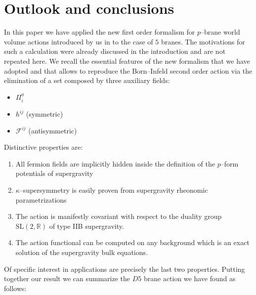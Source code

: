 \documentclass[a4paper,11pt]{article}
\begin{document}
\section{Outlook and conclusions}
\label{outlook}
In this paper we have applied the new first order formalism for
$p$--brane world volume actions introduced by us in \cite{noidued3} to the case of
$5$ branes. The motivations for such a calculation were already discussed in the introduction and
are not repeated here. We recall the essential features of the new formalism  that
we have adopted and that allows to reproduce the
Born--Infeld second order action via the elimination of a set composed by three auxiliary fields:
\begin{itemize}
  \item $\Pi^{\underline{a}}_i$
  \item $h^{ij}$ (symmetric)
  \item $\mathcal{F}^{ij}$ (antisymmetric)
\end{itemize}
Distinctive properties are:
\begin{enumerate}
  \item All fermion fields are implicitly hidden inside
  the definition of the $p$--form potentials of supergravity
  \item $\kappa$--supersymmetry is easily proven from supergravity
  rheonomic parametrizations
  \item The action is manifestly covariant with respect to the duality group
  $\mathrm{SL(2,\mathbb{R})}$ of type IIB supergravity.
  \item The action functional can be computed on any background which
  is an exact solution of the supergravity bulk equations.
\end{enumerate}
Of specific interest in applications are precisely the last two
properties. Putting together our result we can summarize the $D5$ brane action we have found as follows:
\end{document}
